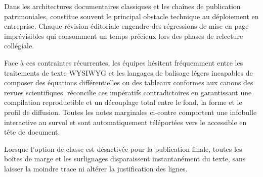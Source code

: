 \begin{WordGeometry}
Dans les architectures documentaires classiques et les chaînes de publication patrimoniales,
constitue souvent le principal obstacle technique au déploiement en entreprise.
Chaque révision éditoriale engendre des régressions de mise en page imprévisibles
qui consomment un temps précieux lors des phases de relecture collégiale.

Face à ces contraintes récurrentes, les équipes hésitent fréquemment entre les traitements de texte WYSIWYG
et les langages de balisage légers incapables de composer des équations différentielles ou des tableaux conformes aux canons des revues scientifiques.
réconcilie ces impératifs contradictoires en garantissant une compilation reproductible
et un découplage total entre le fond, la forme et le profil de diffusion.
Toutes les notes marginales ci-contre comportent une infobulle interactive au survol
et sont automatiquement téléportées vers le 
accessible en tête de document.

\begin{callout}
Lorsque l'option de classe  est désactivée pour la publication finale,
toutes les boîtes de marge et les surlignages disparaissent instantanément du texte,
sans laisser la moindre trace ni altérer la justification des lignes.
\end{callout}

\end{WordGeometry}

